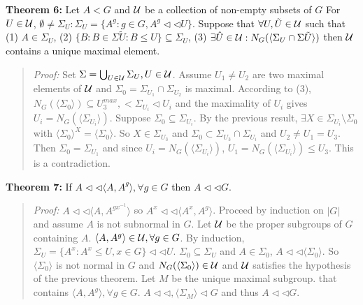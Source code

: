 {\bf Theorem 6:}
Let $A < G$ and ${\cal U}$ be a collection of non-empty subsets of $G$
For $U \in {\cal U}$, $\emptyset \ne \Sigma_U:
\Sigma_U = \{ A^g : g \in G, A^g \lhd \lhd U \}$.  Suppose that $\forall U, \tilde{U} \in {\cal U}$
such that (1) $A \in \Sigma_U$, (2) $\{ B: B \in \Sigma{\tilde{U}} : B \le U \} \subseteq \Sigma_U$,
(3) $\exists \hat{U} \in {\cal U}: N_G( \langle \Sigma_U \cap \Sigma{\tilde{U}} \rangle)$
then ${\cal U}$ contains a unique maximal element.
\begin{quote}
\emph{Proof:}
Set $\Sigma= \bigcup_{U \in {\cal U}} \Sigma_U, U \in {\cal U}$.  Assume $U_1 \ne U_2$
are two maximal elements of ${\cal U}$ and $\Sigma_0 = \Sigma_{U_1} \cap \Sigma_{U_2}$
is maximal.  According to (3), $N_G( \langle \Sigma_0 \rangle) \subseteq U_3^{max}, <\Sigma_{U_i} \lhd U_i$
and the maximality of $U_i$ gives $U_i= N_G( \langle \Sigma_{U_i} \rangle)$.
Suppose $\Sigma_0 \subseteq \Sigma_{U_i}$.  By the previous result, $\exists X \in \Sigma_{U_i} \setminus \Sigma_0$ with $ \langle \Sigma_0 \rangle^X = \langle \Sigma_0 \rangle $.  So
$X \in \Sigma_{U_3}$ and $\Sigma_0 \subset \Sigma_{U_3} \cap \Sigma_{U_i}$ and
$U_2 \ne U_1 = U_3$.  Then $\Sigma_0 = \Sigma_{U_1}$ and since
$U_i= N_G( \langle \Sigma_{U_i} \rangle)$,
$U_1= N_G( \langle \Sigma_{U_i} \rangle) \le U_3$.  This is a contradiction.
\end{quote}
{\bf Theorem 7:}
If $A \lhd \lhd \langle A,A^g \rangle , \forall g \in G$ then $A \lhd \lhd G$.
\begin{quote}
\emph{Proof:}
$A \lhd \lhd \langle A , A^{gx^{-1}} \rangle $ so
$A^x \lhd \lhd \langle A^x , A^{g} \rangle $.  Proceed by induction on $|G|$ and assume $A$ is not
subnormal in $G$.  Let ${\cal U}$ be the proper subgroups of $G$ containing $A$.
$ \langle A, A^g \rangle \in {\cal U}, \forall g \in G$.  By induction,
$\Sigma_U= \{ A^x: A^x \le U, x \in G \} \lhd \lhd U$.  $\Sigma_0 \subseteq \Sigma_U$
and $A \in \Sigma_0$, $A \lhd \lhd \langle \Sigma_0 \rangle $.  So
$ \langle \Sigma_0 \rangle $ is not normal in $G$ and $N_G( \langle \Sigma_0 \rangle) \in {\cal U}$ and ${\cal U}$
satisfies the hypothesis of the previous theorem.  Let $M$ be the unique maximal subgroup.
that contains $ \langle A, A^g \rangle , \forall g \in G$.  $A \lhd \lhd , \langle \Sigma_M \rangle \lhd G$ and
thus $A \lhd \lhd G$.
\end{quote}
